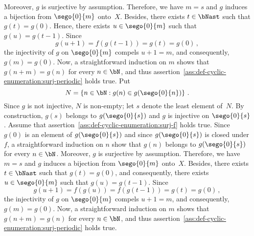    Moreover, $g$ is surjective by assumption.
   Therefore, we have $m = s$ and $g$ induces a bijection from $\sego{0}{m}$ onto~$X$.
   Besides, there exists $t \in \bNast$ such that $g(t) = g(0)$.
   Hence, there exists $u \in \sego{0}{m}$ such that $g(u) = g(t - 1)$.
   Since
   $$g(u + 1) = f(g(t - 1)) = g(t) = g(0) \, ,$$
   the injectivity of $g$ on $\sego{0}{m}$ compels $u + 1 = m$,
   and consequently, $g(m) = g(0)$.
   Now, a straightforward induction on $m$ shows that $g(n + m) = g(n)$ for every $n \in \bN$,
   and thus assertion~\ref{ass:def-cyclic-enumeration:surj-periodic} holds true.
   Put
   $$
   N = \left\{ n \in \bN : g(n) \in g(\sego{0}{n}) \right\} \, .
   $$
   Since $g$ is not injective, $N$ is non-empty;
   let $s$ denote the least element of~$N$.  
   By construction,
   $g(s)$ belongs to $g(\sego{0}{s})$ and
   $g$ is injective on $\sego{0}{s}$.
   Assume that assertion~\ref{ass:def-cyclic-enumeration:surj-f} holds true.
   Since $g(0)$ is an element of $g(\sego{0}{s})$ and since $g(\sego{0}{s})$ is closed under $f$,
   a straightforward induction on $n$ show that $g(n)$ belongs to $g(\sego{0}{s})$ for every $n \in \bN$.
   Moreover, $g$ is surjective by assumption.
   Therefore, we have $m = s$ and $g$ induces a bijection from $\sego{0}{m}$ onto~$X$.
   Besides, there exists $t \in \bNast$ such that $g(t) = g(0)$,
   and consequently,
   there exists $u \in \sego{0}{m}$ such that $g(u) = g(t - 1)$.
   Since
   $$g(u + 1) = f(g(u)) = f(g(t - 1)) = g(t) = g(0) \, ,$$
   the injectivity of $g$ on $\sego{0}{m}$ compels $u + 1 = m$,
   and consequently, $g(m) = g(0)$.
   Now, a straightforward induction on $m$ shows that $g(n + m) = g(n)$ for every $n \in \bN$,
   and thus assertion~\ref{ass:def-cyclic-enumeration:surj-periodic} holds true.
 
